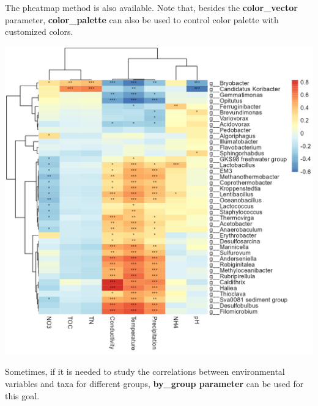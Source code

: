 \documentclass[
]{book}
\newenvironment{Shaded}{\begin{snugshade}}{\end{snugshade}}
\newcommand{\AttributeTok}[1]{\textcolor[rgb]{0.77,0.63,0.00}{#1}}
\newcommand{\CommentTok}[1]{\textcolor[rgb]{0.56,0.35,0.01}{\textit{#1}}}
\newcommand{\ConstantTok}[1]{\textcolor[rgb]{0.00,0.00,0.00}{#1}}
\newcommand{\DecValTok}[1]{\textcolor[rgb]{0.00,0.00,0.81}{#1}}
\newcommand{\FunctionTok}[1]{\textcolor[rgb]{0.00,0.00,0.00}{#1}}
\newcommand{\NormalTok}[1]{#1}
\newcommand{\SpecialCharTok}[1]{\textcolor[rgb]{0.00,0.00,0.00}{#1}}
\newcommand{\StringTok}[1]{\textcolor[rgb]{0.31,0.60,0.02}{#1}}
\begin{document}
The pheatmap method is also available.
Note that, besides the \textbf{color\_vector} parameter,
\textbf{color\_palette} can also be used to control color palette with customized colors.

\begin{Shaded}
\end{Shaded}

\begin{center}\includegraphics[width=700px]{Images/trans_env_corr_pheatmap} \end{center}

Sometimes, if it is needed to study the correlations between environmental variables and taxa for different groups,
\textbf{by\_group parameter} can be used for this goal.
\end{document}
